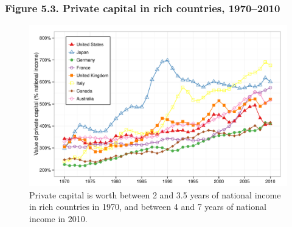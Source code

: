 \documentclass[t]{beamer}\usepackage[]{graphicx}\usepackage[]{color}
\newenvironment{knitrout}{}{} %
\begin{document}
\begin{frame}[label=Figure_5_3]
\frametitle{Figure 5.3. Private capital in rich countries, 1970--2010}
\begin{figure}[t]
\begin{minipage}[b]{\textwidth}
\centering
\begin{knitrout}\footnotesize
{}\color{fgcolor}

{\centering \includegraphics[width=1\linewidth]{figures/color/Figure_5_3} 

}



\end{knitrout}
\caption{Private capital is worth between 2 and 3.5 years of national income in rich countries in 1970, and between 4 and 7 years of national income in 2010.}
\end{minipage}
\end{figure}
\end{frame}
\end{document}
